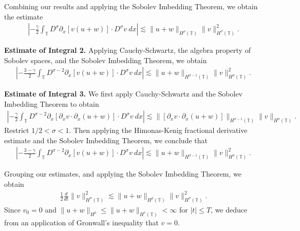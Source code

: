 \documentclass{beamer}
\newcommand{\p}{\partial}
\newcommand{\ci}{\mathbb{T}}
\begin{document}
\begin{frame}


Combining our results and applying the Sobolev Imbedding 
Theorem, we obtain the estimate
%
%
\begin{equation*}
\begin{split}
\left |  -\frac{\gamma}{2} \int_{\ci} D^\sigma \p_x [v(u+w)] \cdot
D^\sigma v \ dx \right |
 \lesssim \|u+w\|_{H^\rho(\ci)} \|v\|_{H^\sigma(\ci)}^2.
\label{8v}
\end{split}
\end{equation*}
%
%

{\bf Estimate of Integral 2.} Applying Cauchy-Schwartz, the algebra property of Sobolev spaces, and the 
Sobolev Imbedding Theorem, we obtain 
%
%
%
%
\begin{equation*}
\begin{split}
\left | - \frac{3-\gamma}{2} \int_{\ci}  D^{\sigma -2}
\p_x[v(u+w)] \cdot
D^\sigma v \ dx  \right |
 \lesssim \|u+w\|_{H^{\sigma -1}(\ci)} \|v\|_{H^\sigma(\ci)}^2.
\label{3v}
\end{split}
\end{equation*}
%
%
%

{\bf Estimate of Integral 3.} We first apply
Cauchy-Schwartz and the Sobolev Imbedding Theorem to obtain
%
%
\begin{equation*}
\begin{split}
\left | - \frac{\gamma}{2} \int_{\ci} D^{\sigma 
-2} \p_x [ \p_x v
\cdot \p_x (u+w)]\cdot D^\sigma v \ dx \right | 
 \lesssim 
\|[\p_x v \cdot \p_x (u+w)] \|_{H^{\sigma -1}(\ci)}
\|v\|_{H^\sigma(\ci)}.
\end{split}
\end{equation*}
%
%
Restrict $1/2 < \sigma < 1$. Then applying the Himonas-Kenig fractional 
derivative estimate and the Sobolev 
Imbedding Theorem, we conclude that
%
%
\begin{equation*}
\begin{split}
\left | - \frac{3-\gamma}{2} \int_{\ci}  D^{\sigma -2}
\p_x[v(u+w)] \cdot
D^\sigma v \ dx  \right |
 \lesssim \|u+w \|_{H^{\sigma - 1}(\ci)}
\|v\|_{H^\sigma(\ci)}^2.
\label{3'v}
\end{split}
\end{equation*}
%
%
%
\end{frame}
%

\begin{frame}

Grouping our estimates, and
applying
the Sobolev Imbedding Theorem, we obtain
%
%
\begin{equation*}
\begin{split}
\frac{1}{2} \frac{d}{dt}
\|v\|_{H^\sigma(\ci)}^2 \lesssim \|u+w\|_{H^\rho(\ci)}
\|v\|_{H^\sigma(\ci)}^2.
\label{9v}
\end{split}
\end{equation*}
%
%
%
%
%
%
Since $v_0 = 0$ and $\|u + w \|_{H^\rho}
\le \|u + w \|_{H^s(\ci)} < \infty$ for $|t| \le T$, we deduce from 
an application of  Gronwall's 
inequality that $v = 0$. \qquad \qedsymbol
%
%
%
\end{frame}
\end{document}

